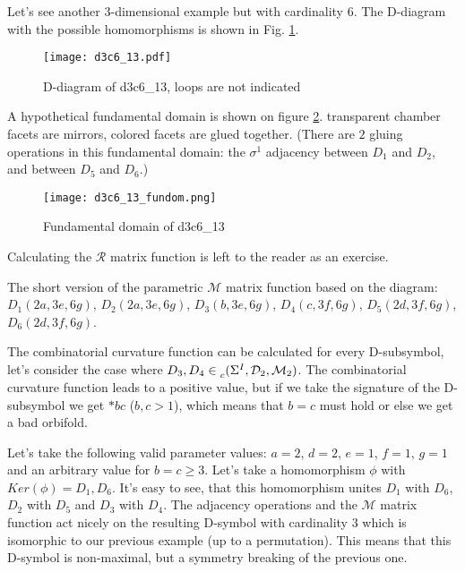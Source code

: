 \documentclass[12pt,a4paper]{article}
\numberwithin{equation}{section}
\newcommand{\leftsub}[2]{{\vphantom{#2}}_{#1}{#2}}
\theoremstyle{plain}%
\theoremstyle{definition}
\theoremstyle{remark}
\begin{document}






Let's see another $3$-dimensional example but with cardinality $6$. The
D-diagram with the possible homomorphisms is shown in Fig.
\ref{fig:d3c6_13}.

\begin{figure}
  \caption{\label{fig:d3c6_13} D-diagram of d3c6\_13, loops are not indicated}
  \center
  \texttt{[image: d3c6\_13.pdf]}
\end{figure}

A hypothetical fundamental domain is shown on figure \ref{fig:d3c6_13_fundom}.
transparent chamber facets are mirrors, colored facets are glued together.
(There are $2$ gluing operations in this fundamental domain: the $\sigma^1$ adjacency between
$D_1$ and $D_2$, and between $D_5$ and $D_6$.)

\begin{figure}
  \caption{\label{fig:d3c6_13_fundom} Fundamental domain of d3c6\_13}
  \center
  \texttt{[image: d3c6\_13\_fundom.png]}
\end{figure}

Calculating the $\mathcal{R}$ matrix function is left to the reader as an
exercise.

The short version of the parametric $\mathcal{M}$ matrix function based on the
diagram: $D_1(2a, 3e, 6g)$, $D_2(2a, 3e, 6g)$, $D_3(b, 3e, 6g)$, $D_4(c, 3f,
6g)$, $D_5(2d, 3f, 6g)$, $D_6(2d, 3f, 6g)$.

The combinatorial curvature function can be calculated for every D-subsymbol,
let's consider the case where
$D_3,D_4\in\leftsub{c}{(\Sigma^I,\mathcal{D}_2,\mathcal{M}_2)}$. The combinatorial
curvature function leads to a positive value, but if we take the signature of
the D-subsymbol we get $*bc$ ($b,c>1$), which means that $b=c$ must hold or else
we get a bad orbifold.

Let's take the following valid parameter values: $a=2$, $d=2$, $e=1$, $f=1$, $g=1$ and
an arbitrary value for $b=c\geq3$. Let's take a homomorphism $\phi$ with
$Ker(\phi)={D_1,D_6}$. It's easy to see, that this homomorphism unites $D_1$
with $D_6$, $D_2$ with $D_5$ and $D_3$ with $D_4$. The adjacency operations and
the $\mathcal{M}$ matrix function act nicely on the resulting D-symbol
with cardinality $3$ which is isomorphic to our previous example (up to a
permutation). This means that this D-symbol is non-maximal, but a symmetry
breaking of the previous one. 
\end{document}
